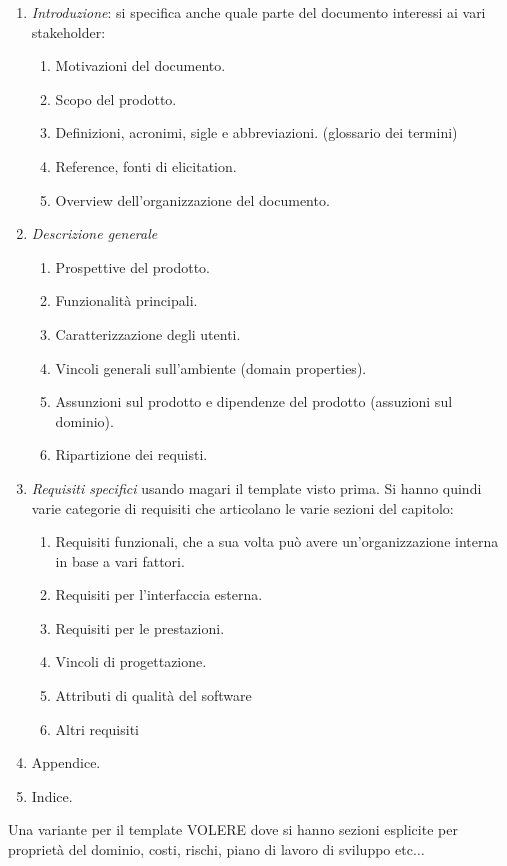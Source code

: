 \begin{enumerate}
      \item \textit{Introduzione}: si specifica anche quale parte del documento
            interessi ai vari stakeholder:
            \begin{enumerate}
                  \item Motivazioni del documento.
                  \item Scopo del prodotto.
                  \item Definizioni, acronimi, sigle e abbreviazioni. (glossario dei termini)
                  \item Reference, fonti di elicitation.
                  \item Overview dell'organizzazione del documento.
            \end{enumerate}
      \item \textit{Descrizione generale}
            \begin{enumerate}
                  \item Prospettive del prodotto.
                  \item Funzionalità principali.
                  \item Caratterizzazione degli utenti.
                  \item Vincoli generali sull'ambiente (domain properties).
                  \item Assunzioni sul prodotto e dipendenze del prodotto 
                        (assuzioni sul dominio).
                  \item Ripartizione dei requisti.
            \end{enumerate}
      \item \textit{Requisiti specifici} usando magari il template visto prima.
            Si hanno quindi varie categorie di requisiti che articolano le varie
            sezioni del capitolo:
            \begin{enumerate}
                  \item Requisiti funzionali, che a sua volta può avere
                        un'organizzazione interna in base a vari fattori.
                  \item Requisiti per l'interfaccia esterna.
                  \item Requisiti per le prestazioni.
                  \item Vincoli di progettazione.
                  \item Attributi di qualità del software
                  \item Altri requisiti
            \end{enumerate}
      \item Appendice.
      \item Indice.
\end{enumerate}
Una variante per il template VOLERE dove si hanno sezioni esplicite per proprietà
del dominio, costi, rischi, piano di lavoro di sviluppo etc$\dots$

